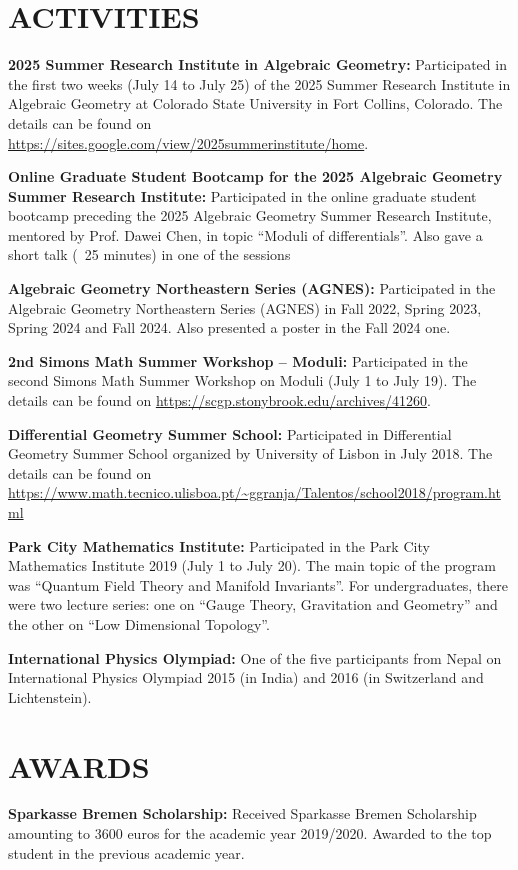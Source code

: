 \documentclass[margin]{res}
\begin{document}
\begin{resume}
\section{ACTIVITIES}
\par
\textbf{2025 Summer Research Institute in Algebraic Geometry:} Participated in the first two weeks (July 14 to July 25) of the 2025 Summer Research Institute in Algebraic Geometry at Colorado State University in Fort Collins, Colorado. The details can be found on \url{https://sites.google.com/view/2025summerinstitute/home}.
\par
\textbf{Online Graduate Student Bootcamp for the 2025 Algebraic Geometry Summer Research Institute:} Participated in the online graduate student bootcamp preceding the 2025 Algebraic Geometry Summer Research Institute, mentored by Prof. Dawei Chen, in topic ``Moduli of differentials''. Also gave a short talk (~25 minutes) in one of the sessions
\par
\textbf{Algebraic Geometry Northeastern Series (AGNES):} Participated in the Algebraic Geometry Northeastern Series (AGNES) in Fall 2022, Spring 2023, Spring 2024 and Fall 2024. Also presented a poster in the Fall 2024 one.
\par
\textbf{2nd Simons Math Summer Workshop -- Moduli:} Participated in the second Simons Math Summer Workshop on Moduli (July 1 to July 19). The details can be found on  \url{https://scgp.stonybrook.edu/archives/41260}.
\par
\textbf{Differential Geometry Summer School:} Participated in Differential Geometry Summer School organized by University of Lisbon in July 2018. The details can be found on  \url{https://www.math.tecnico.ulisboa.pt/~ggranja/Talentos/school2018/program.html}
\par
\textbf{Park City Mathematics Institute:} Participated in the Park City Mathematics Institute 2019 (July 1 to July 20). The main topic of the program was ``Quantum Field Theory and Manifold Invariants''. For undergraduates, there were two lecture series: one on ``Gauge Theory, Gravitation and Geometry'' and the other on ``Low Dimensional Topology''.
\par
\textbf{International Physics Olympiad:} One of the five participants from Nepal on International Physics Olympiad 2015 (in India) and 2016 (in Switzerland and Lichtenstein).

\section{AWARDS}
\textbf{Sparkasse Bremen Scholarship:} Received Sparkasse Bremen Scholarship amounting to 3600 euros for the academic year 2019/2020. Awarded to the top student in the previous academic year.


\end{resume}
\end{document}
